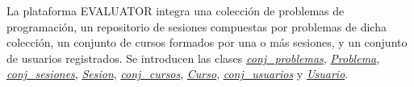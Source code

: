 La plataforma E\+V\+A\+L\+U\+A\+T\+OR integra una colección de problemas de programación, un repositorio de sesiones compuestas por problemas de dicha colección, un conjunto de cursos formados por una o más sesiones, y un conjunto de usuarios registrados. Se introducen las clases {\itshape \mbox{\hyperlink{classconj__problemas}{conj\+\_\+problemas}}}, {\itshape \mbox{\hyperlink{class_problema}{Problema}}}, {\itshape \mbox{\hyperlink{classconj__sesiones}{conj\+\_\+sesiones}}}, {\itshape \mbox{\hyperlink{class_sesion}{Sesion}}}, {\itshape \mbox{\hyperlink{classconj__cursos}{conj\+\_\+cursos}}}, {\itshape \mbox{\hyperlink{class_curso}{Curso}}}, {\itshape \mbox{\hyperlink{classconj__usuarios}{conj\+\_\+usuarios}}} y {\itshape \mbox{\hyperlink{class_usuario}{Usuario}}}. 
